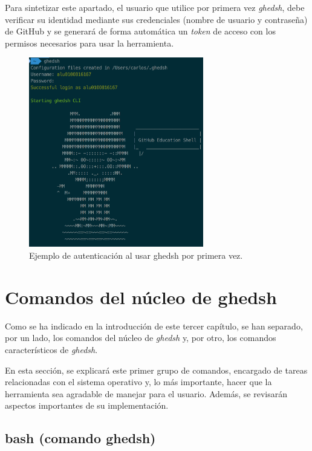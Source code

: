 Para sintetizar este apartado, el usuario que utilice por primera vez {\it ghedsh}, debe verificar su identidad mediante sus credenciales (nombre de usuario y contraseña) de GitHub y se
generará de forma automática un {\it token} de acceso con los permisos necesarios para usar la herramienta.

\begin{figure}[H]
	\begin{center}
	\includegraphics[width=0.68\textwidth]{images/login-example.png}
	\caption{Ejemplo de autenticación al usar ghedsh por primera vez.}
	\label{fig:masterv1}
	\end{center}
\end{figure}

\section{Comandos del núcleo de ghedsh}
\label{3:sec:2}

Como se ha indicado en la introducción de este tercer capítulo, se han separado, por un lado, los comandos del núcleo de {\it ghedsh} y, por otro, los comandos característicos de {\it ghedsh}.
\bigskip

En esta sección, se explicará este primer grupo de comandos, encargado de tareas relacionadas con el sistema operativo y, lo más importante, hacer que la herramienta sea agradable de manejar para el usuario. Además, se revisarán aspectos importantes de su implementación.

\subsection{bash (comando ghedsh)}
\label{3.2.1}

